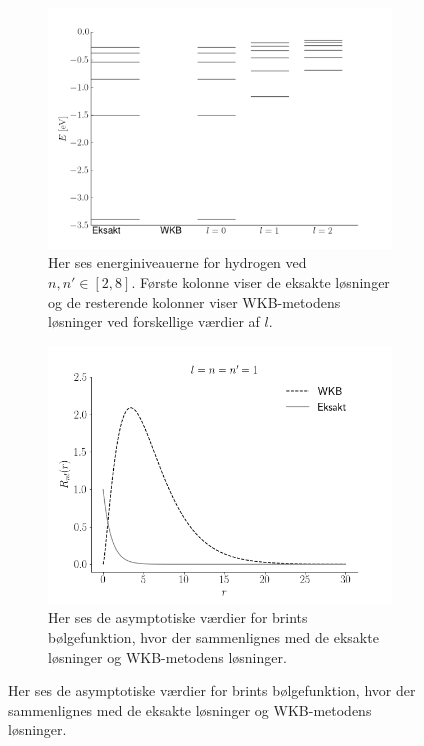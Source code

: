 \begin{figure}[h!]
    \centering
    \caption{Sammenligning mellem brints eksakte- og WKB-metodens løsninger.}
    \begin{subfigure}[t]{0.48\textwidth}
        \centering
        \includegraphics[width=\linewidth]{energyPlot}
        \caption{Her ses energiniveauerne for hydrogen ved $n, n'\in[2, 8]$. Første kolonne viser de eksakte løsninger og de resterende kolonner viser WKB-metodens løsninger ved forskellige værdier af $l$.} 
        \label{fig:hydrogen}
    \end{subfigure}%
    \hfill
    \begin{subfigure}[t]{0.48\textwidth}
        \centering
        \includegraphics[width=\linewidth]{sammenligning}
        \caption{Her ses de asymptotiske værdier for brints bølgefunktion, hvor der sammenlignes med de eksakte løsninger og WKB-metodens løsninger.}
        \label{fig:sammenligning}
    \end{subfigure}
    \label{bigfig}
\end{figure}

